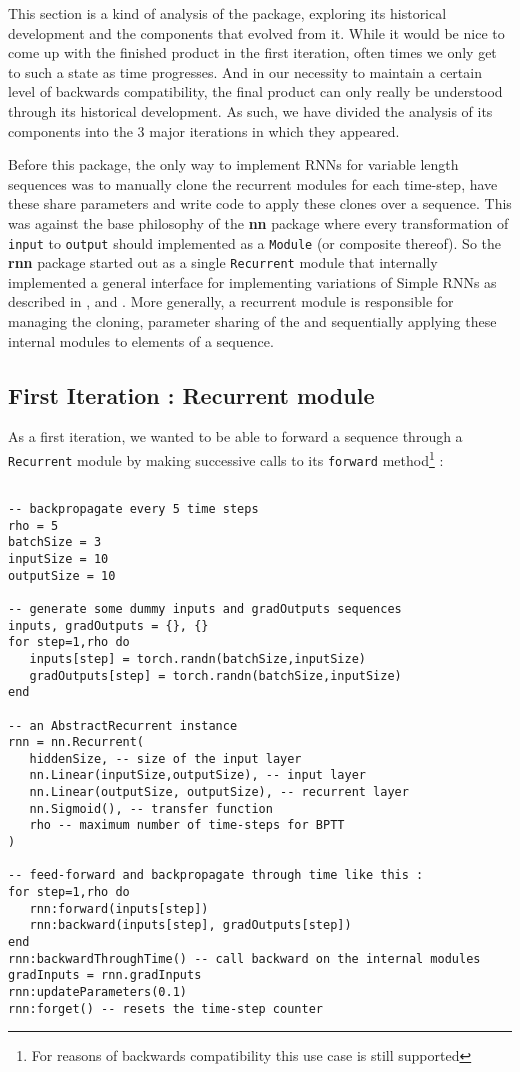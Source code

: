 \documentclass{article} %
\providecommand{\inlinecode}[1]{\texttt{#1}}
\begin{document}
This section is a kind of analysis of the package, exploring 
its historical development and the components that evolved from it. 
While it would be nice to come up 
with the finished product in the first iteration, often times we only get to such a state 
as time progresses. And in our necessity to maintain a certain level of backwards compatibility,
the final product can only really be understood through its historical development.
As such, we have divided the analysis of its components into the 3 major iterations in 
which they appeared.
 
Before this package, the only way to implement RNNs for variable length sequences was to manually 
clone the recurrent modules for each time-step, have these share parameters and
write code to apply these clones over a sequence. This was against the base
philosophy of the \textbf{nn} package where every transformation of \inlinecode{input} to \inlinecode{output} should 
implemented as a \inlinecode{Module} (or composite thereof). 
So the \textbf{rnn} package started out as a single \inlinecode{Recurrent} module that 
internally implemented a general interface for implementing variations of Simple RNNs
as described in \cite[section 2.5-2.8]{sutskever2013training}, 
\cite[section~3.2-3.3]{mikolov2012statistical} and \cite{boden2001guide}. 
More generally, a recurrent module is responsible for managing the cloning, 
parameter sharing of the and sequentially applying these internal modules
to elements of a sequence. 

\subsection{First Iteration : Recurrent module}

As a first iteration, we wanted to be able to forward a sequence through a \inlinecode{Recurrent}
module by making successive calls to its \inlinecode{forward} method\footnote{For reasons of backwards 
compatibility this use case is still supported} :

\begin{verbatim}

-- backpropagate every 5 time steps
rho = 5
batchSize = 3
inputSize = 10
outputSize = 10

-- generate some dummy inputs and gradOutputs sequences
inputs, gradOutputs = {}, {}
for step=1,rho do
   inputs[step] = torch.randn(batchSize,inputSize)
   gradOutputs[step] = torch.randn(batchSize,inputSize)
end

-- an AbstractRecurrent instance
rnn = nn.Recurrent(
   hiddenSize, -- size of the input layer
   nn.Linear(inputSize,outputSize), -- input layer
   nn.Linear(outputSize, outputSize), -- recurrent layer
   nn.Sigmoid(), -- transfer function
   rho -- maximum number of time-steps for BPTT
)

-- feed-forward and backpropagate through time like this :
for step=1,rho do
   rnn:forward(inputs[step])
   rnn:backward(inputs[step], gradOutputs[step])
end
rnn:backwardThroughTime() -- call backward on the internal modules
gradInputs = rnn.gradInputs
rnn:updateParameters(0.1)
rnn:forget() -- resets the time-step counter
\end{verbatim}
\end{document}
